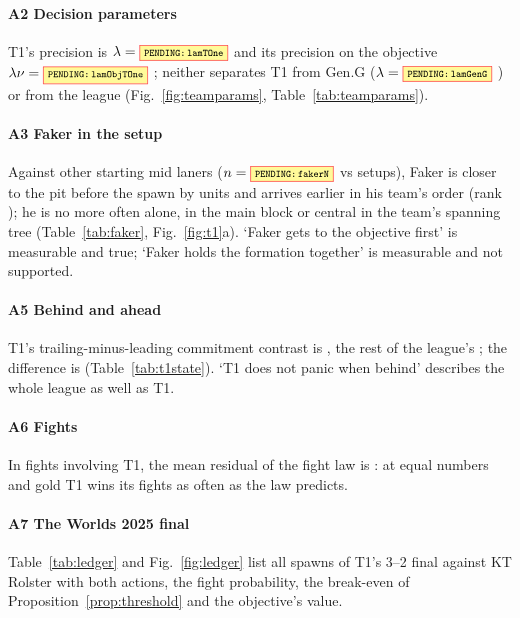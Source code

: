 \paragraph*{A2 Decision parameters}
T1's precision is $\lambda=\V{lamTOne}$  and its precision on the objective $\lambda\nu=\V{lamObjTOne}$ ; neither separates T1 from Gen.G ($\lambda=\V{lamGenG}$ ) or from the league (Fig.~\ref{fig:teamparams}, Table~\ref{tab:teamparams}).


\paragraph*{A3 Faker in the setup}
Against other starting mid laners ($n=\V{fakerN}$ vs  setups), Faker is closer to the pit before the spawn by   units and arrives earlier in his team's order (rank  ); he is no more often alone, in the main block or central in the team's spanning tree (Table~\ref{tab:faker}, Fig.~\ref{fig:t1}a).
`Faker gets to the objective first' is measurable and true; `Faker holds the formation together' is measurable and not supported.

\paragraph*{A5 Behind and ahead}
T1's trailing-minus-leading commitment contrast is  , the rest of the league's ; the difference is   (Table~\ref{tab:t1state}).
`T1 does not panic when behind' describes the whole league as well as T1.

\paragraph*{A6 Fights}
In  fights involving T1, the mean residual of the fight law is  : at equal numbers and gold T1 wins its fights as often as the law predicts.

\paragraph*{A7 The Worlds 2025 final}
Table~\ref{tab:ledger} and Fig.~\ref{fig:ledger} list all  spawns of T1's 3--2 final against KT Rolster with both actions, the fight probability, the break-even of Proposition~\ref{prop:threshold} and the objective's value.

